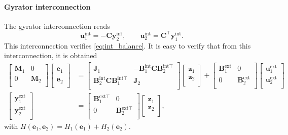 \documentclass{svjour3}                     %
\begin{document}
\paragraph{Gyrator interconnection}
The gyrator interconnection reads
\begin{equation*}
\bm{u}_1^{\text{int}} = -\bm{C} \bm{y}_2^{\text{int}}, \qquad
\bm{u}_2^{\text{int}} = \bm{C}^\top \bm{y}_1^{\text{int}}.
\end{equation*}
This interconnection verifies \eqref{eq:int_balance}. It is easy to verify that from this interconnection, it is obtained
\begin{align*}
\begin{bmatrix}
\bm{M}_1 & 0 \\ 0 & \bm{M}_2 \\
\end{bmatrix}
\begin{bmatrix}
\dot{\bm{e}}_1 \\ \dot{\bm{e}}_2 \\
\end{bmatrix} &= 
\begin{bmatrix}
\bm{J}_1 & -\bm{B}_1^{\text{int}} \bm{C} \bm{B}_2^{\text{int} \top} \\ 
\bm{B}_2^{\text{int}} \bm{C} \bm{B}_1^{\text{int} \top}  & \bm{J}_2 \\
\end{bmatrix}
\begin{bmatrix}
\bm{z}_1 \\ 
\bm{z}_2 \\
\end{bmatrix}+ 
\begin{bmatrix}
\bm{B}_1^{\text{ext}} & 0 \\ 0 & \bm{B}_2^{\text{ext}} \\
\end{bmatrix} 
\begin{bmatrix}
\bm{u}_1^{\text{ext}} \\ \bm{u}_2^{\text{ext}} \\
\end{bmatrix}  \\
\begin{bmatrix}
\bm{y}_1^{\text{ext}} \\ \bm{y}_2^{\text{ext}} \\
\end{bmatrix}  &= \begin{bmatrix}
\bm{B}_1^{\text{ext} \top} & 0 \\
0 & \bm{B}_2^{\text{ext} \top} \\
\end{bmatrix} \begin{bmatrix}
\bm{z}_1 \\ 
\bm{z}_2 \\
\end{bmatrix},
\end{align*}
with $H(\bm{e}_1, \bm{e}_2) = H_1(\bm{e}_1) + H_2(\bm{e}_2)$.
\end{document}

